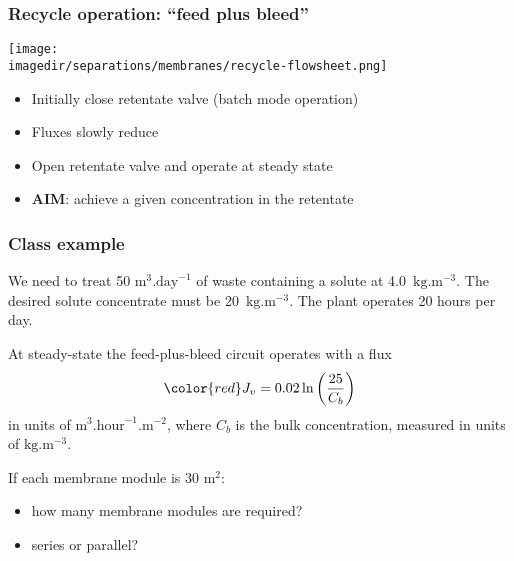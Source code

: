 \begin{frame}\frametitle{Recycle operation: ``feed plus bleed''}
	\begin{center}
		\texttt{[image: \\imagedir/separations/membranes/recycle-flowsheet.png]}
	\end{center}
	\begin{itemize}
		\item	Initially close retentate valve (batch mode operation)
		\item	Fluxes slowly reduce
		\item	Open retentate valve and operate at steady state
		\item	\textbf{AIM}: achieve a given concentration in the retentate 
	\end{itemize}
\end{frame}

\begin{frame}\frametitle{Class example}
	We need to treat 50 $\text{m}^3\text{.day}^{-1}$ of waste containing a solute at 4.0~$\text{kg}\text{.m}^{-3}$. The desired solute concentrate must be 20~$\text{kg}\text{.m}^{-3}$. The plant operates 20 hours per day.

	\vspace{12pt}
	At steady-state the feed-plus-bleed circuit operates with a flux
	\[
		{\color{red}J_v} = 0.02 \ln \left(\frac{25}{C_b} \right)
	\]
	in units of $\text{m}^3.\text{hour}^{-1}.\text{m}^{-2}$, where $C_b$ is the bulk concentration, measured in units of $\text{kg}\text{.m}^{-3}$.

	\vspace{12pt}
	If each membrane module is 30 m$^2$:
	\begin{itemize}
		\item	how many membrane modules are required?
		\item	series or parallel?
	\end{itemize}
\end{frame}

